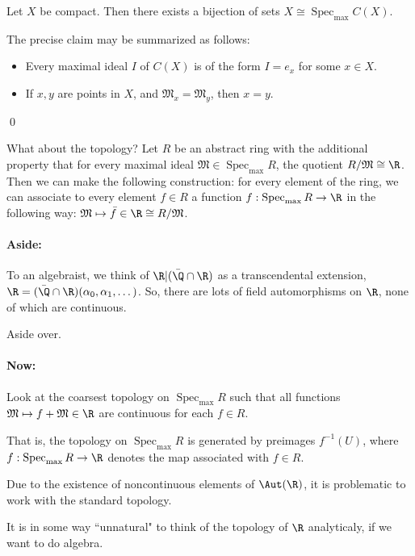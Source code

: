 \documentclass[x11names,reqno,14pt]{extarticle}
\newcommand{\mk}[1]{\mathfrak{#1}}
\newcommand{\barf}{\bar{f}}
\newcommand{\Specmax}{\operatorname{Spec}_{\operatorname{max}}}
\begin{document}
\prop

Let $X$ be compact. Then there exists a bijection of sets $X \cong \Specmax C(X)$. 

The precise claim may be summarized as follows: 
\begin{itemize}

\item Every maximal ideal $I$ of $C(X)$ is of the form $I = e_x$ for some $x \in X$. 

\item If $x, y$ are points in $X$, and $\mathfrak{M}_x  =\mathfrak{M}_y$, then $x = y$. 

\end{itemize}

\proof
\qed

What about the topology? Let $R$ be an abstract ring with the additional property that for every maximal ideal $\mk{M}\in\Specmax R$, the quotient $R/\mk{M} \cong \R$. Then we can make the following construction: for every element of the ring, we can associate to every element $f \in R$ a function $f:\Specmax R \to \R$ in the following way: $\mk{M}\mapsto \barf \in \R \cong R/\mk{M}$. 

\paragraph{Aside:}

To an algebraist, we think of $\R|(\bar{\Q}\cap\R)$ as a transcendental extension, $\R = (\bar{\Q}\cap \R)(\alpha_0,\alpha_1,\dots)$. So, there are lots of field automorphisms on $\R$, none of which are continuous. 

Aside over. 

\paragraph{Now:} Look at the coarsest topology on $\Specmax R$ such that all functions $\mk{M} \mapsto f + \mk{M} \in \R$ are continuous for each $f \in R$. 

That is, the topology on $\Specmax R$ is generated by preimages $f^{-1}(U)$, where $f:\Specmax R\to\R$ denotes the map associated with $f \in R$. 

Due to the existence of noncontinuous elements of $\Aut(\R)$, it is problematic to work with the standard topology. 

It is in some way ``unnatural" to think of the topology of $\R$ analyticaly, if we want to do algebra. 
\end{document}
